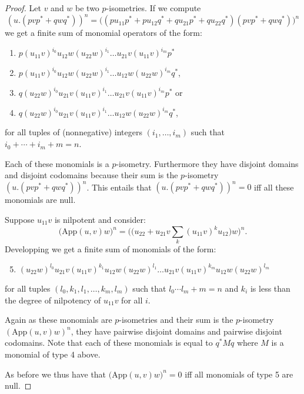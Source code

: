 \begin{proof}
Let $v$ and $w$ be two $p$-isometries. If we compute
\begin{equation*}
(u.(pvp^* + qwq^*))^n = \bigl((pu_{11}p^* + pu_{12}q^* + qu_{21}p^* + qu_{22}q^*)(pvp^* + qwq^*)\bigr)^n
\end{equation*}
we get a finite sum of monomial operators of the form:
\begin{enumerate}
\item $p(u_{11}v)^{i_0}u_{12}w(u_{22}w)^{i_1}\dots u_{21}v(u_{11}v)^{i_m}p^*$
\item $p(u_{11}v)^{i_0}u_{12}w(u_{22}w)^{i_1}\dots u_{12}w(u_{22}w)^{i_m}q^*$,
\item $q(u_{22}w)^{i_0}u_{21}v(u_{11}v)^{i_1}\dots u_{21}v(u_{11}v)^{i_m}p^*$ or
\item $q(u_{22}w)^{i_0}u_{21}v(u_{11}v)^{i_1}\dots u_{12}w(u_{22}w)^{i_m}q^*$,
\end{enumerate}
for all tuples of (nonnegative) integers $(i_1,\dots, i_m)$ such that $i_0+\cdots+i_m+m = n$.

Each of these monomials is a $p$-isometry. Furthermore they have disjoint domains and disjoint codomains because their sum is the $p$-isometry $(u.(pvp^* + qwq^*))^n$. This entails that $(u.(pvp^* + qwq^*))^n = 0$ iff all these monomials are null.

Suppose $u_{11}v$ is nilpotent and consider:
\begin{equation*}
\bigl(\mathrm{App}(u,v)w\bigr)^n = \biggl(\bigl(u_{22} + u_{21}v\sum_k(u_{11}v)^k u_{12}\bigr)w\biggr)^n.
\end{equation*}
Developping we get a finite sum of monomials of the form:
\begin{enumerate}\setcounter{enumi}{4}
\item $(u_{22}w)^{l_0}u_{21}v(u_{11}v)^{k_1}u_{12}w(u_{22}w)^{l_1}\dots u_{21}v(u_{11}v)^{k_m}u_{12}w(u_{22}w)^{l_m}$
\end{enumerate}
for all tuples $(l_0, k_1, l_1,\dots, k_m, l_m)$ such that $l_0\cdots l_m + m = n$ and $k_i$ is less than the degree of nilpotency of $u_{11}v$ for all $i$.

Again as these monomials are $p$-isometries and their sum is the $p$-isometry $(\mathrm{App}(u,v)w)^n$, they have pairwise disjoint domains and pairwise disjoint codomains. Note that each of these monomials is equal to $q^*Mq$ where $M$ is a monomial of type 4 above.

As before we thus have that $\bigl(\mathrm{App}(u,v)w\bigr)^n = 0$ iff all monomials of type 5 are null.


\end{proof}
